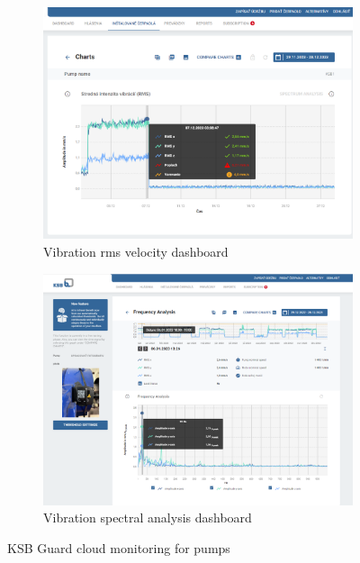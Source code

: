 \begin{figure}[h]
    \centering
    \begin{subfigure}[b]{0.49\textwidth}
    		\centering
        \includegraphics[width=\textwidth]{assets/design/ksb-guard-rms.png}
        \caption{Vibration rms velocity dashboard}
    \end{subfigure}
    \hfill
    \begin{subfigure}[b]{0.49\textwidth}
    		\centering
        \includegraphics[width=\textwidth]{assets/design/ksb-guard-spectrum.png}
        \caption{Vibration spectral analysis dashboard}
    \end{subfigure}
     \caption{KSB Guard cloud monitoring for pumps}
     \label{fig:design:ksb-guard}
\end{figure}

